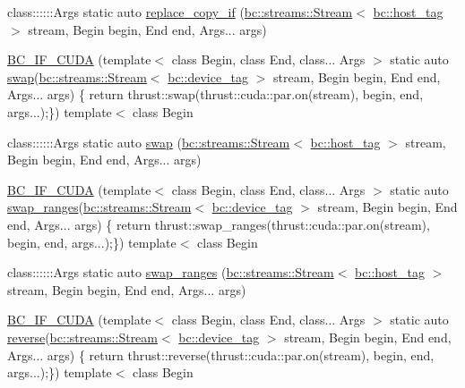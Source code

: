 \begin{DoxyCompactItemize}
\item 
class\+::::::\+Args static auto \hyperlink{namespacebc_1_1algorithms_aeff94887b8b785a757aa0c183a686d58}{replace\+\_\+copy\+\_\+if} (\hyperlink{classbc_1_1streams_1_1Stream}{bc\+::streams\+::\+Stream}$<$ \hyperlink{structbc_1_1host__tag}{bc\+::host\+\_\+tag} $>$ stream, Begin begin, End end, Args... args)
\item 
\hyperlink{namespacebc_1_1algorithms_a47e1b1106d9aa8d3e55064143957af4a}{B\+C\+\_\+\+I\+F\+\_\+\+C\+U\+DA} (template$<$ class Begin, class End, class... Args $>$ static auto \hyperlink{namespacebc_1_1algorithms_a85e269467990595f74e2723ac77ca978}{swap}(\hyperlink{classbc_1_1streams_1_1Stream}{bc\+::streams\+::\+Stream}$<$ \hyperlink{structbc_1_1device__tag}{bc\+::device\+\_\+tag} $>$ stream, Begin begin, End end, Args... args) \{ return thrust\+::swap(thrust\+::cuda\+::par.\+on(stream), begin, end, args...);\}) template$<$ class Begin
\item 
class\+::::::\+Args static auto \hyperlink{namespacebc_1_1algorithms_a85e269467990595f74e2723ac77ca978}{swap} (\hyperlink{classbc_1_1streams_1_1Stream}{bc\+::streams\+::\+Stream}$<$ \hyperlink{structbc_1_1host__tag}{bc\+::host\+\_\+tag} $>$ stream, Begin begin, End end, Args... args)
\item 
\hyperlink{namespacebc_1_1algorithms_a2919a40c80751a424661748ebd0b3884}{B\+C\+\_\+\+I\+F\+\_\+\+C\+U\+DA} (template$<$ class Begin, class End, class... Args $>$ static auto \hyperlink{namespacebc_1_1algorithms_aa7e4438a64dd70ccf829a31d377dd183}{swap\+\_\+ranges}(\hyperlink{classbc_1_1streams_1_1Stream}{bc\+::streams\+::\+Stream}$<$ \hyperlink{structbc_1_1device__tag}{bc\+::device\+\_\+tag} $>$ stream, Begin begin, End end, Args... args) \{ return thrust\+::swap\+\_\+ranges(thrust\+::cuda\+::par.\+on(stream), begin, end, args...);\}) template$<$ class Begin
\item 
class\+::::::\+Args static auto \hyperlink{namespacebc_1_1algorithms_aa7e4438a64dd70ccf829a31d377dd183}{swap\+\_\+ranges} (\hyperlink{classbc_1_1streams_1_1Stream}{bc\+::streams\+::\+Stream}$<$ \hyperlink{structbc_1_1host__tag}{bc\+::host\+\_\+tag} $>$ stream, Begin begin, End end, Args... args)
\item 
\hyperlink{namespacebc_1_1algorithms_af284529916bb84a5144b4f616f35de0f}{B\+C\+\_\+\+I\+F\+\_\+\+C\+U\+DA} (template$<$ class Begin, class End, class... Args $>$ static auto \hyperlink{namespacebc_1_1algorithms_abb783ac679bb0f75ee3a5ec7defed717}{reverse}(\hyperlink{classbc_1_1streams_1_1Stream}{bc\+::streams\+::\+Stream}$<$ \hyperlink{structbc_1_1device__tag}{bc\+::device\+\_\+tag} $>$ stream, Begin begin, End end, Args... args) \{ return thrust\+::reverse(thrust\+::cuda\+::par.\+on(stream), begin, end, args...);\}) template$<$ class Begin

\end{DoxyCompactItemize}
